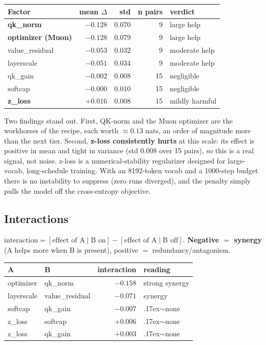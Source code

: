 \documentclass[11pt]{article}
\begin{document}
\begin{table}[h]
\centering
\small
\begin{tabular}{@{}lRRRl@{}}
\toprule
\textbf{Factor} & \textbf{mean $\Delta$} & \textbf{std} & \textbf{n pairs} & \textbf{verdict} \\
\midrule
\textbf{qk\_norm}        & $-0.128$ & 0.070 & 9  & large help \\
\textbf{optimizer (Muon)}& $-0.128$ & 0.079 & 9  & large help \\
value\_residual          & $-0.053$ & 0.032 & 9  & moderate help \\
layerscale               & $-0.051$ & 0.034 & 9  & moderate help \\
qk\_gain                 & $-0.002$ & 0.008 & 15 & negligible \\
softcap                  & $-0.000$ & 0.010 & 15 & negligible \\
\textbf{z\_loss}         & $+0.016$ & 0.008 & 15 & mildly harmful \\
\bottomrule
\end{tabular}
\end{table}

Two findings stand out. First, QK-norm and the Muon optimizer are the workhorses
of the recipe, each worth ${\approx}0.13$ nats, an order of magnitude more
than the next tier. Second, \textbf{z-loss consistently hurts} at this scale:
its effect is positive in mean and tight in variance (std 0.008 over 15 pairs),
so this is a real signal, not noise. z-loss is a numerical-stability regularizer
designed for large-vocab, long-schedule training. With an 8192-token vocab and a
1000-step budget there is no instability to suppress (zero runs diverged), and
the penalty simply pulls the model off the cross-entropy objective.

\subsection{Interactions}

$\text{interaction} = [\text{effect of A} \mid \text{B on}] - [\text{effect of A}
\mid \text{B off}]$. \textbf{Negative $=$ synergy} (A helps more when B is
present), positive $=$ redundancy/antagonism.

\begin{table}[h]
\centering
\small
\begin{tabular}{@{}llRl@{}}
\toprule
\textbf{A} & \textbf{B} & \textbf{interaction} & \textbf{reading} \\
\midrule
optimizer  & qk\_norm        & $-0.158$ & strong synergy \\
layerscale & value\_residual & $-0.071$ & synergy \\
softcap    & qk\_gain        & $-0.007$ & {\raise.17ex\hbox{$\scriptstyle\sim$}}none \\
z\_loss    & softcap         & $+0.006$ & {\raise.17ex\hbox{$\scriptstyle\sim$}}none \\
z\_loss    & qk\_gain        & $+0.003$ & {\raise.17ex\hbox{$\scriptstyle\sim$}}none \\
\bottomrule
\end{tabular}
\end{table}
\end{document}
